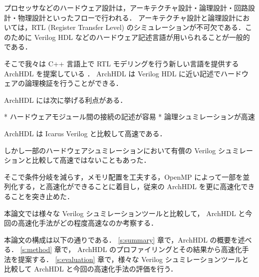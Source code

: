 プロセッサなどのハードウェア設計は，アーキテクチャ設計・論理設計・回路設計・物理設計といったフローで行われる．
アーキテクチャ設計と論理設計においては，RTL (Register Transfer Level)
のシミュレーションが不可欠である．このために
Verilog HDL などのハードウェア記述言語が用いられることが一般的である．

そこで我々は C++ 言語上で RTL モデリングを行う新しい言語を提供する ArchHDL を提案している \cite{satos:archhdl}．
ArchHDL は Verilog HDL に近い記述でハードウェアの論理検証を行うことができる．

ArchHDL には次に挙げる利点がある．

* ハードウェアモジュール間の接続の記述が容易
* 論理シュミレーションが高速

ArchHDL は Icarus Verilog \cite{iverilog}と比較して高速である．

しかし一部のハードウェアシュミレーションにおいて有償の Verilog シュミレーションと比較して高速ではないこともあった．

そこで条件分岐を減らす，メモリ配置を工夫する，OpenMP によって一部を並列化する，と高速化ができることに着目し，従来の ArchHDL を更に高速化できることを突き止めた．

本論文では様々な Verilog シュミレーションツールと比較して， ArchHDL と今回の高速化手法がどの程度高速なのか考察する．


本論文の構成は以下の通りである． \ref{s:summary} 章で，ArchHDL の概要を述べる．
\ref{s:method} 章で， ArchHDL のプロファイリングとその結果から高速化手法を提案する．
\ref{s:evaluation} 章で，様々な Verilog シュミレーションツールと比較して ArchHDL と今回の高速化手法の評価を行う．


